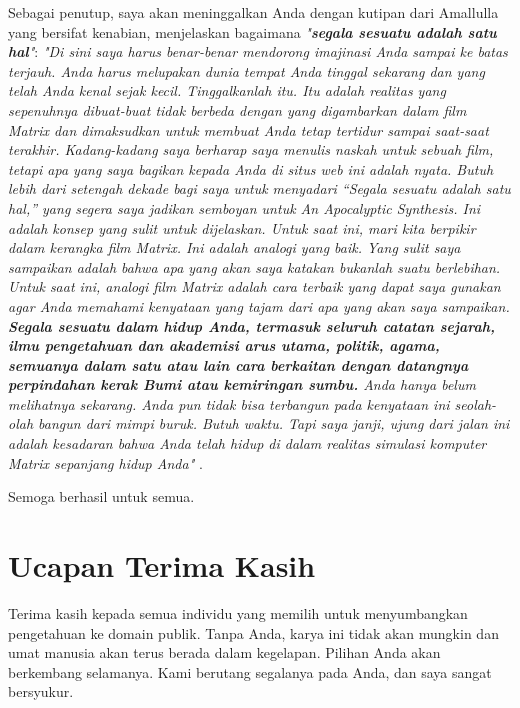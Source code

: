 \documentclass[10pt,twocolumn,letterpaper]{article}
\begin{document}
Sebagai penutup, saya akan meninggalkan Anda dengan kutipan dari Amallulla yang bersifat kenabian, menjelaskan bagaimana \textit{"\textbf{segala sesuatu adalah satu hal}"}: \textit{"Di sini saya harus benar-benar mendorong imajinasi Anda sampai ke batas terjauh. Anda harus melupakan dunia tempat Anda tinggal sekarang dan yang telah Anda kenal sejak kecil. Tinggalkanlah itu. Itu adalah realitas yang sepenuhnya dibuat-buat tidak berbeda dengan yang digambarkan dalam film Matrix dan dimaksudkan untuk membuat Anda tetap tertidur sampai saat-saat terakhir. Kadang-kadang saya berharap saya menulis naskah untuk sebuah film, tetapi apa yang saya bagikan kepada Anda di situs web ini adalah nyata. Butuh lebih dari setengah dekade bagi saya untuk menyadari “Segala sesuatu adalah satu hal,” yang segera saya jadikan semboyan untuk An Apocalyptic Synthesis. Ini adalah konsep yang sulit untuk dijelaskan. Untuk saat ini, mari kita berpikir dalam kerangka film Matrix. Ini adalah analogi yang baik. Yang sulit saya sampaikan adalah bahwa apa yang akan saya katakan bukanlah suatu berlebihan. Untuk saat ini, analogi film Matrix adalah cara terbaik yang dapat saya gunakan agar Anda memahami kenyataan yang tajam dari apa yang akan saya sampaikan. \textbf{Segala sesuatu dalam hidup Anda, termasuk seluruh catatan sejarah, ilmu pengetahuan dan akademisi arus utama, politik, agama, semuanya dalam satu atau lain cara berkaitan dengan datangnya perpindahan kerak Bumi atau kemiringan sumbu.} Anda hanya belum melihatnya sekarang. Anda pun tidak bisa terbangun pada kenyataan ini seolah-olah bangun dari mimpi buruk. Butuh waktu. Tapi saya janji, ujung dari jalan ini adalah kesadaran bahwa Anda telah hidup di dalam realitas simulasi komputer Matrix sepanjang hidup Anda"} \cite{33,34}.

Semoga berhasil untuk semua.

\section{Ucapan Terima Kasih}

Terima kasih kepada semua individu yang memilih untuk menyumbangkan pengetahuan ke domain publik. Tanpa Anda, karya ini tidak akan mungkin dan umat manusia akan terus berada dalam kegelapan. Pilihan Anda akan berkembang selamanya. Kami berutang segalanya pada Anda, dan saya sangat bersyukur.

\clearpage
\twocolumn

{\small
\renewcommand{\refname}{References}


}
\end{document}
